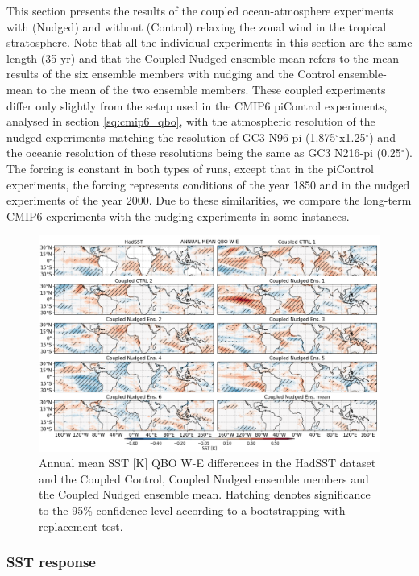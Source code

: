 This section presents the results of the coupled ocean-atmosphere experiments with (Nudged) and without (Control) relaxing the zonal wind in the tropical stratosphere. Note that all the individual experiments in this section are the same length (35 yr) and that the Coupled Nudged  ensemble-mean refers to the mean results of the six ensemble members with nudging and the Control ensemble-mean to the mean of the two ensemble members.
These coupled experiments differ only slightly from the setup used in the CMIP6 piControl experiments, analysed in section \ref{sq:cmip6_qbo}, with the atmospheric resolution of the nudged experiments matching the resolution of GC3 N96-pi (1.875$^\circ$x1.25$^\circ$) and the oceanic resolution of these resolutions being the same as GC3 N216-pi (0.25$^\circ$). The forcing is constant in both types of runs, except that in the piControl experiments, the forcing represents conditions of the year 1850 and in the nudged experiments of the year 2000. 
Due to these similarities, we compare the long-term CMIP6 experiments with the nudging experiments in some instances.

\begin{figure}[t!]
\centering
 \includegraphics[width=\linewidth]{figures/sst_check_climqbowqboe.png}
\caption[Annual mean SST response to the QBO in coupled nudged experiments]{ Annual mean SST [K] QBO W-E differences in the HadSST dataset and the Coupled Control, Coupled Nudged ensemble members and the Coupled Nudged ensemble mean. Hatching denotes significance to the 95\% confidence level according to a bootstrapping with replacement test.}
\label{fig:sst_clim_coupled}
\end{figure}

\subsubsection{SST response}



